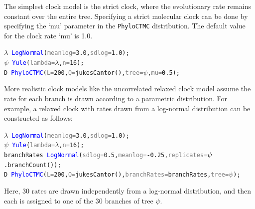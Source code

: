 \documentclass[10pt,letterpaper,table]{article}
\theoremstyle{definition}
\begin{document}
The simplest clock model is the strict clock, where the evolutionary rate remains constant over the entire tree. 
Specifying a strict molecular clock can be done by specifying the `mu' parameter in the \texttt{PhyloCTMC} distribution.
The default value for the clock rate `mu' is 1.0.
{\small
\begin{alltt}
    \textcolor{bluishgreen}{\(\lambda\)} ~ \textcolor{blue}{LogNormal}(\textcolor{gray}{meanlog=}\textcolor{constant}{3.0}, \textcolor{gray}{sdlog=}\textcolor{constant}{1.0});
    \textcolor{bluishgreen}{\(\psi\)} ~ \textcolor{blue}{Yule}(\textcolor{gray}{lambda=}\textcolor{bluishgreen}{\(\lambda\)}, \textcolor{gray}{n=}\textcolor{constant}{16});
    \textcolor{bluishgreen}{D} ~ \textcolor{blue}{PhyloCTMC}(\textcolor{gray}{L=}\textcolor{constant}{200}, \textcolor{gray}{Q=}\textcolor{generator}{jukesCantor}(), \textcolor{gray}{tree=}\textcolor{bluishgreen}{\(\psi\)}, \textcolor{gray}{mu=}\textcolor{constant}{0.5});
\end{alltt}
}
More realistic clock models like the uncorrelated relaxed clock model \cite{drummond2006relaxedconfidence} assume the rate for each branch is drawn according to a parametric distribution. 
For example, a relaxed clock with rates drawn from a log-normal distribution can be constructed as follows:

{
\small
\begin{alltt}
  \textcolor{bluishgreen}{\(\lambda\)} ~ \textcolor{blue}{LogNormal}(\textcolor{gray}{meanlog=}\textcolor{constant}{3.0}, \textcolor{gray}{sdlog=}\textcolor{constant}{1.0});
  \textcolor{bluishgreen}{\(\psi\)} ~ \textcolor{blue}{Yule}(\textcolor{gray}{lambda=}\textcolor{bluishgreen}{\(\lambda\)}, \textcolor{gray}{n=}\textcolor{constant}{16});
  \textcolor{bluishgreen}{branchRates} ~ \textcolor{blue}{LogNormal}(\textcolor{gray}{sdlog=}\textcolor{constant}{0.5}, \textcolor{gray}{meanlog=}\textcolor{constant}{-0.25}, \textcolor{gray}{replicates=}\textcolor{bluishgreen}{\(\psi\)}.\textcolor{generator}{branchCount}());
  \textcolor{bluishgreen}{D} ~ \textcolor{blue}{PhyloCTMC}(\textcolor{gray}{L=}\textcolor{constant}{200}, \textcolor{gray}{Q=}\textcolor{generator}{jukesCantor}(), \textcolor{gray}{branchRates=}\textcolor{bluishgreen}{branchRates}, \textcolor{gray}{tree=}\textcolor{bluishgreen}{\(\psi\)});
\end{alltt}
}

Here, 30 rates are drawn independently from a log-normal distribution, and then each is assigned to one of the 30 branches of tree $\psi$.
\end{document}
